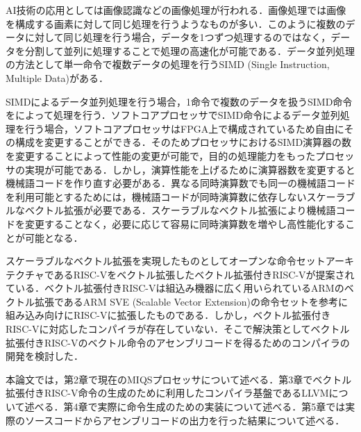 AI技術の応用としては画像認識などの画像処理が行われる．画像処理では画像を構成する画素に対して同じ処理を行うようなものが多い．このように複数のデータに対して同じ処理を行う場合，データを1つずつ処理するのではなく，データを分割して並列に処理することで処理の高速化が可能である．データ並列処理の方法として単一命令で複数データの処理を行うSIMD (Single Instruction, Multiple Data)がある．

SIMDによるデータ並列処理を行う場合，1命令で複数のデータを扱うSIMD命令をによって処理を行う．ソフトコアプロセッサでSIMD命令によるデータ並列処理を行う場合，ソフトコアプロセッサはFPGA上で構成されているため自由にその構成を変更することができる．そのためプロセッサにおけるSIMD演算器の数を変更することによって性能の変更が可能で，目的の処理能力をもったプロセッサの実現が可能である．しかし，演算性能を上げるために演算器数を変更すると機械語コードを作り直す必要がある．異なる同時演算数でも同一の機械語コードを利用可能とするためには，機械語コードが同時演算数に依存しないスケーラブルなベクトル拡張が必要である．スケーラブルなベクトル拡張により機械語コードを変更することなく，必要に応じて容易に同時演算数を増やし高性能化することが可能となる．

スケーラブルなベクトル拡張を実現したものとしてオープンな命令セットアーキテクチャであるRISC-V\cite{bib:risc-v}をベクトル拡張したベクトル拡張付きRISC-V\cite{bib:kimura}が提案されている．ベクトル拡張付きRISC-Vは組込み機器に広く用いられているARMのベクトル拡張であるARM SVE (Scalable Vector Extension)\cite{bib:arm_sve}の命令セットを参考に組み込み向けにRISC-Vに拡張したものである．しかし，ベクトル拡張付きRISC-Vに対応したコンパイラが存在していない．そこで解決策としてベクトル拡張付きRISC-Vのベクトル命令のアセンブリコードを得るためのコンパイラの開発を検討した．

本論文では，第2章で現在のMIQSプロセッサについて述べる．第3章でベクトル拡張付きRISC-V命令の生成のために利用したコンパイラ基盤であるLLVM\cite{bib:llvm}について述べる．第4章で実際に命令生成のための実装について述べる．第5章では実際のソースコードからアセンブリコードの出力を行った結果について述べる．